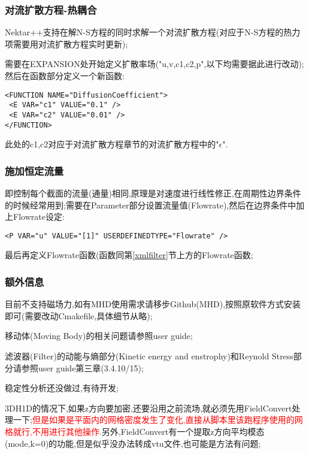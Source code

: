 \subsubsection{对流扩散方程-热耦合}
Nektar++支持在解N-S方程的同时求解一个对流扩散方程(对应于N-S方程的热力项需要用对流扩散方程实时更新);\par
需要在EXPANSION处开始定义扩散率场("u,v,c1,c2,p",以下均需要据此进行改动);然后在函数部分定义一个新函数:
\begin{lstlisting}[frame=single]
<FUNCTION NAME="DiffusionCoefficient">
 <E VAR="c1" VALUE="0.1" />
 <E VAR="c2" VALUE="0.01" />
</FUNCTION>
\end{lstlisting}
\par
此处的c1,c2对应于对流扩散方程章节的对流扩散方程中的"$\epsilon$".


\subsubsection{施加恒定流量}
即控制每个截面的流量(通量)相同,原理是对速度进行线性修正,在周期性边界条件的时候经常用到;需要在Parameter部分设置流量值(Flowrate),然后在边界条件中加上Flowrate设定:
\begin{lstlisting}[frame=single]
<P VAR="u" VALUE="[1]" USERDEFINEDTYPE="Flowrate" />
\end{lstlisting}
\par
最后再定义Flowrate函数(函数同第\ref{xmlfilter}节上方的Flowrate函数;\par



\subsubsection{额外信息}
目前不支持磁场力,如有MHD使用需求请移步Github(MHD),按照原软件方式安装即可(需要改动Cmakefile,具体细节从略);\par
移动体(Moving Body)的相关问题请参照user guide;\par
滤波器(Filter)的动能与熵部分(Kinetic energy and enstrophy)和Reynold Stress部分请参照user guide第三章(3.4.10/15);\par
稳定性分析还没做过,有待开发;\par
3DH1D的情况下,如果z方向要加密,还要沿用之前流场,就必须先用FieldConvert处理一下;\textcolor{red}{但是如果是平面内的网格密度发生了变化,直接从脚本里该跑程序使用的网格就行,不用进行其他操作.}另外,FieldConvert有一个提取z方向平均模态(mode,k=0)的功能,但是似乎没办法转成vtu文件,也可能是方法有问题;


